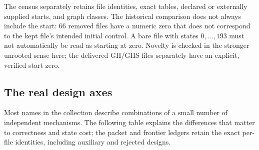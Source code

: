\documentclass[11pt,letterpaper]{article}
\begin{document}


The census separately retains file identities, exact tables, declared or
externally supplied starts, and graph classes. The historical comparison
does not always include the start: 66 removed files have a numeric zero
that does not correspond to the kept file's intended initial control.
A bare file with states $0,\ldots,193$ must not automatically be read as
starting at zero. Novelty is checked in the stronger unrooted sense here;
the delivered GH/GHS files separately have an explicit, verified start zero.

\subsection{The real design axes}

Most names in the collection describe combinations of a small number of
independent mechanisms. The following table explains the differences that
matter to correctness and state cost; the packet and frontier ledgers retain
the exact per-file identities, including auxiliary and rejected designs.
\end{document}
